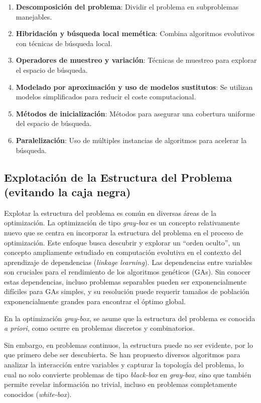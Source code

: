 \begin{enumerate}
    \item \textbf{Descomposición del problema}: Dividir el problema en subproblemas manejables.
    \item \textbf{Hibridación y búsqueda local memética}: Combina algoritmos evolutivos con técnicas de búsqueda local.
    \item \textbf{Operadores de muestreo y variación}: Técnicas de muestreo para explorar el espacio de búsqueda.
    \item \textbf{Modelado por aproximación y uso de modelos sustitutos}: Se utilizan modelos simplificados para reducir el coste computacional.
    \item \textbf{Métodos de inicialización}: Métodos para asegurar una cobertura uniforme del espacio de búsqueda.
    \item \textbf{Paralelización}: Uso de múltiples instancias de algoritmos para acelerar la búsqueda.
\end{enumerate}

\subsection{Explotación de la Estructura del Problema (evitando la caja negra)}

Explotar la estructura del problema es común en diversas áreas de la optimización. La optimización de tipo \textit{gray-box} es un concepto relativamente nuevo que se centra en incorporar la estructura del problema en el proceso de optimización. Este enfoque busca descubrir y explorar un “orden oculto”, un concepto ampliamente estudiado en computación evolutiva en el contexto del aprendizaje de dependencias (\textit{linkage learning}). Las dependencias entre variables son cruciales para el rendimiento de los algoritmos genéticos (GAs). Sin conocer estas dependencias, incluso problemas separables pueden ser exponencialmente difíciles para GAs simples, y su resolución puede requerir tamaños de población exponencialmente grandes para encontrar el óptimo global.

En la optimización \textit{gray-box}, se asume que la estructura del problema es conocida \textit{a priori}, como ocurre en problemas discretos y combinatorios.

Sin embargo, en problemas continuos, la estructura puede no ser evidente, por lo que primero debe ser descubierta. Se han propuesto diversos algoritmos para analizar la interacción entre variables y capturar la topología del problema, lo cual no solo convierte problemas de tipo \textit{black-box} en \textit{gray-box}, sino que también permite revelar información no trivial, incluso en problemas completamente conocidos (\textit{white-box}).

